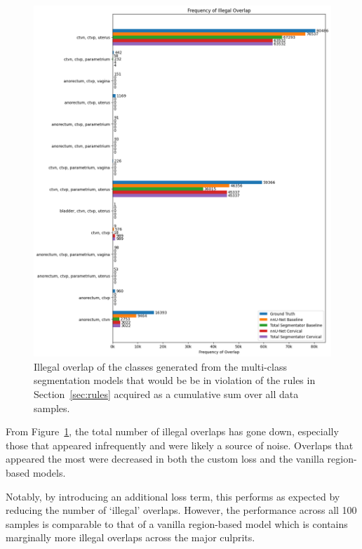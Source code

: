 \documentclass[11pt,twoside]{report}
\begin{document}
\begin{figure}[H]
  \centering
  \includegraphics[height=.65\textheight, trim=0 0 0 20, clip]{../../research/source/code/nnUNet/3_gt_engineering/overlap_frequency_combined.png}
  \caption{Illegal overlap of the classes generated from the multi-class segmentation models that would be be in violation of the rules in Section~\ref{sec:rules} acquired as a cumulative sum over all data samples.}\label{fig:illegal-overlap-total}
\end{figure}

From Figure~\ref{fig:illegal-overlap-total}, the total number of illegal overlaps has gone down, especially those that appeared infrequently and were likely a source of noise. Overlaps that appeared the most were decreased in both the custom loss and the vanilla region-based models.

Notably, by introducing an additional loss term, this performs as expected by reducing the number of `illegal' overlaps. However, the performance across all 100 samples is comparable to that of a vanilla region-based model which is contains marginally more illegal overlaps across the major culprits.
\end{document}
